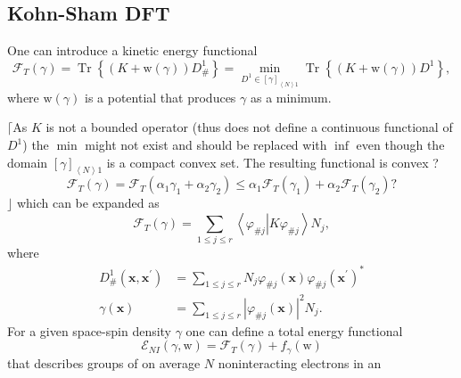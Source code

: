 \documentclass[aps,preprint]{revtex4}%
\begin{document}
\subsection{Kohn-Sham DFT}

One can introduce a kinetic energy functional%
\begin{equation}
\mathcal{F}_{T}\left(  \gamma\right)  =\operatorname{Tr}\left\{  \left(
K+\mathrm{w}\left(  \gamma\right)  \right)  D_{\#}^{1}\right\}  =\min
_{D^{1}\in\left[  \gamma\right]  _{\left\langle N\right\rangle 1}%
}\operatorname{Tr}\left\{  \left(  K+\mathrm{w}\left(  \gamma\right)  \right)
D^{1}\right\}  , \label{KEFunc}%
\end{equation}
where $\mathrm{w}\left(  \gamma\right)  $ is a potential that produces
$\gamma$ as a minimum.

$\lceil$As $K$ is not a bounded operator (thus does not define a continuous
functional of $D^{1}$) the $\min$ might not exist and should be replaced with
$\inf$ even though the domain $\left[  \gamma\right]  _{\left\langle
N\right\rangle 1}$ is a compact convex set. The resulting functional is convex
?
\begin{equation}
\mathcal{F}_{T}\left(  \gamma\right)  =\mathcal{F}_{T}\left(  \alpha_{1}%
\gamma_{1}+\alpha_{2}\gamma_{2}\right)  \leq\alpha_{1}\mathcal{F}_{T}\left(
\gamma_{1}\right)  +\alpha_{2}\mathcal{F}_{T}\left(  \gamma_{2}\right)  ?
\end{equation}
$\rfloor$ which can be expanded as
\begin{equation}
\mathcal{F}_{T}\left(  \gamma\right)  =\sum_{1\leq j\leq r}\left\langle
\varphi_{\#j}\left\vert K\varphi_{\#j}\right.  \right\rangle N_{j},
\end{equation}
where
\begin{align}
D_{\#}^{1}\left(  \mathbf{x,x}^{\prime}\right)   &  =\sum_{1\leq j\leq r}%
N_{j}\varphi_{\#j}\left(  \mathbf{x}\right)  \varphi_{\#j}\left(
\mathbf{x}^{\prime}\right)  ^{\ast}\nonumber\\
\gamma\left(  \mathbf{x}\right)   &  =\sum_{1\leq j\leq r}\left\vert
\varphi_{\#j}\left(  \mathbf{x}\right)  \right\vert ^{2}N_{j}. \label{gammaKS}%
\end{align}
For a given space-spin density $\gamma$ one can define a total energy
functional
\begin{equation}
\mathcal{E}_{NI}\left(  \gamma\mathbf{,}\mathrm{w}\right)  =\mathcal{F}%
_{T}\left(  \gamma\right)  +f_{\gamma}\left(  \mathrm{w}\right)
\end{equation}
that describes groups of on average $N$ noninteracting electrons in an
\end{document}
